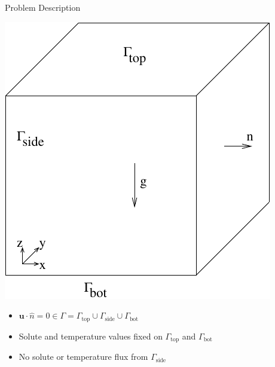 \documentclass[compress,12pt]{beamer}
\newcommand{\bv}[1]{{\boldsymbol{#1}}}
\begin{document}
\begin{frame}{Problem Description}


  \centerline{\includegraphics[width=.55\textwidth]{figures/setup3d}}
\begin{itemize}
  \item $\bv{u} \cdot \hat{n}=0 \in \Gamma = \Gamma_{\text{top}}
    \cup \Gamma_{\text{side}} \cup \Gamma_{\text{bot}}$
    \item Solute and temperature values fixed on $\Gamma_{\text{top}}$ and $\Gamma_{\text{bot}}$
    \item No solute or temperature flux from $\Gamma_{\text{side}}$
\end{itemize}

\end{frame}
\end{document}
